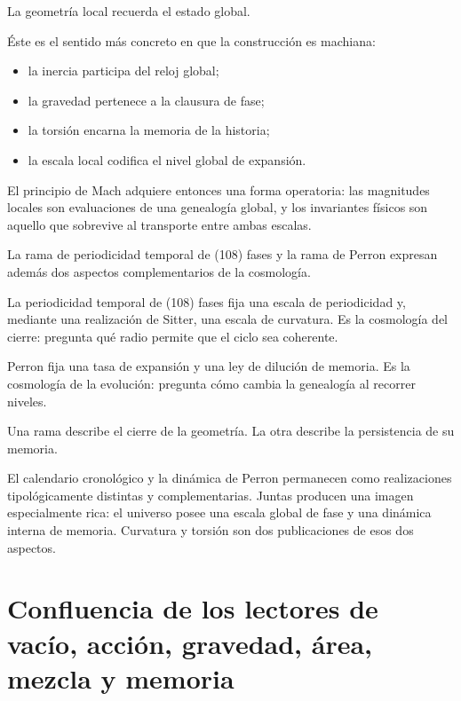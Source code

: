 La geometría local recuerda el estado global.\par

Éste es el sentido más concreto en que la construcción es machiana:\par

\begin{itemize}[leftmargin=*,itemsep=0.35em]
\item la inercia participa del reloj global;
\item la gravedad pertenece a la clausura de fase;
\item la torsión encarna la memoria de la historia;
\item la escala local codifica el nivel global de expansión.
\end{itemize}

El principio de Mach adquiere entonces una forma operatoria: las magnitudes locales son evaluaciones de una genealogía global, y los invariantes físicos son aquello que sobrevive al transporte entre ambas escalas.\par

La rama de periodicidad temporal de (108) fases y la rama de Perron expresan además dos aspectos complementarios de la cosmología.\par

La periodicidad temporal de (108) fases fija una escala de periodicidad y, mediante una realización de Sitter, una escala de curvatura. Es la cosmología del cierre: pregunta qué radio permite que el ciclo sea coherente.\par

Perron fija una tasa de expansión y una ley de dilución de memoria. Es la cosmología de la evolución: pregunta cómo cambia la genealogía al recorrer niveles.\par

Una rama describe el cierre de la geometría. La otra describe la persistencia de su memoria.\par

El calendario cronológico y la dinámica de Perron permanecen como realizaciones tipológicamente distintas y complementarias. Juntas producen una imagen especialmente rica: el universo posee una escala global de fase y una dinámica interna de memoria. Curvatura y torsión son dos publicaciones de esos dos aspectos.\par

\section{Confluencia de los lectores de vacío, acción, gravedad, área, mezcla y memoria}

